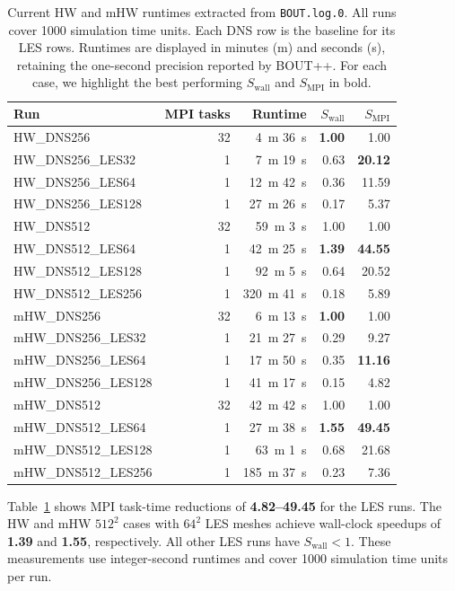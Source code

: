 \documentclass[authoryear,preprint,review,12pt]{elsarticle}
\begin{document}
\begin{table}[ht]
\centering
\small
\caption{Current HW and mHW runtimes extracted from \texttt{BOUT.log.0}. All runs cover 1000 simulation time units. Each DNS row is the baseline for its LES rows. Runtimes are displayed in minutes (m) and seconds (s), retaining the one-second precision reported by BOUT++. For each case, we highlight the best performing $S_\mathrm{wall}$ and $S_\mathrm{MPI}$ in bold.}
\label{tab:performance}
\begin{tabular}{lrrrr}
\toprule
Run & MPI tasks & Runtime & $S_{\mathrm{wall}}$ & $S_{\mathrm{MPI}}$ \\
\midrule
HW\_DNS256 & 32 & 4~m 36~s & \textbf{1.00} & 1.00 \\
HW\_DNS256\_LES32 & 1 & 7~m 19~s & 0.63 & \textbf{20.12} \\
HW\_DNS256\_LES64 & 1 & 12~m 42~s & 0.36 & 11.59 \\
HW\_DNS256\_LES128 & 1 & 27~m 26~s & 0.17 & 5.37 \\
\midrule
HW\_DNS512 & 32 & 59~m 3~s & 1.00 & 1.00 \\
HW\_DNS512\_LES64 & 1 & 42~m 25~s & \textbf{1.39} & \textbf{44.55} \\
HW\_DNS512\_LES128 & 1 & 92~m 5~s & 0.64 & 20.52 \\
HW\_DNS512\_LES256 & 1 & 320~m 41~s & 0.18 & 5.89 \\
\midrule
mHW\_DNS256 & 32 & 6~m 13~s & \textbf{1.00} & 1.00 \\
mHW\_DNS256\_LES32 & 1 & 21~m 27~s & 0.29 & 9.27 \\
mHW\_DNS256\_LES64 & 1 & 17~m 50~s & 0.35 & \textbf{11.16} \\
mHW\_DNS256\_LES128 & 1 & 41~m 17~s & 0.15 & 4.82 \\
\midrule
mHW\_DNS512 & 32 & 42~m 42~s & 1.00 & 1.00 \\
mHW\_DNS512\_LES64 & 1 & 27~m 38~s & \textbf{1.55} & \textbf{49.45} \\
mHW\_DNS512\_LES128 & 1 & 63~m 1~s & 0.68 & 21.68 \\
mHW\_DNS512\_LES256 & 1 & 185~m 37~s & 0.23 & 7.36 \\
\bottomrule
\end{tabular}
\end{table}

Table~\ref{tab:performance} shows MPI task-time reductions of \textbf{4.82--49.45} for the LES runs. The HW and mHW $512^2$ cases with $64^2$ LES meshes achieve wall-clock speedups of \textbf{1.39} and \textbf{1.55}, respectively. All other LES runs have $S_{\mathrm{wall}}<1$. These measurements use integer-second runtimes and cover 1000 simulation time units per run.
\end{document}
